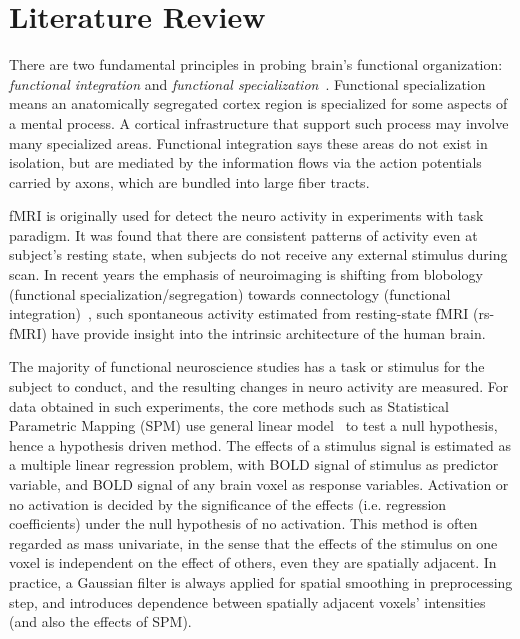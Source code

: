 \documentclass[12pt]{article}
\begin{document}
\section{Literature Review}

There are two fundamental principles in probing brain's functional organization:
\emph{functional integration} and \emph{functional
  specialization}~\cite{friston2007statistical}. Functional specialization means
an anatomically segregated cortex region is specialized for some aspects of a
mental process. A cortical infrastructure that support such process may involve
many specialized areas. Functional integration says these areas do not exist in
isolation, but are mediated by the information flows via the action potentials
carried by axons, which are bundled into large fiber tracts.

fMRI is originally used for detect the neuro activity in experiments with task
paradigm. It was found \cite{raichle2001} that there are consistent patterns of
activity even at subject's resting state, when subjects do not receive any
external stimulus during scan. In recent years the emphasis of neuroimaging is
shifting from blobology (functional specialization/segregation) towards
connectology (functional integration)~\cite{Smith20121257}, such spontaneous
activity estimated from resting-state fMRI (rs-fMRI) have provide insight into
the intrinsic architecture of the human brain. 

The majority of functional neuroscience studies has a task or stimulus for the
subject to conduct, and the resulting changes in neuro activity are
measured. For data obtained in such experiments, the core methods such as
Statistical Parametric Mapping (SPM) use general linear
model~\cite{worsley_analysis_1995} to test a null hypothesis, hence a hypothesis
driven method. The effects of a stimulus signal is estimated as a multiple
linear regression problem, with BOLD signal of stimulus as predictor variable,
and BOLD signal of any brain voxel as response variables. Activation or no
activation is decided by the significance of the effects (i.e. regression
coefficients) under the null hypothesis of no activation. This method is often
regarded as mass univariate, in the sense that the effects of the stimulus on
one voxel is independent on the effect of others, even they are spatially
adjacent. In practice, a Gaussian filter is always applied for spatial smoothing
in preprocessing step, and introduces dependence between spatially adjacent
voxels' intensities (and also the effects of SPM).
\end{document}
